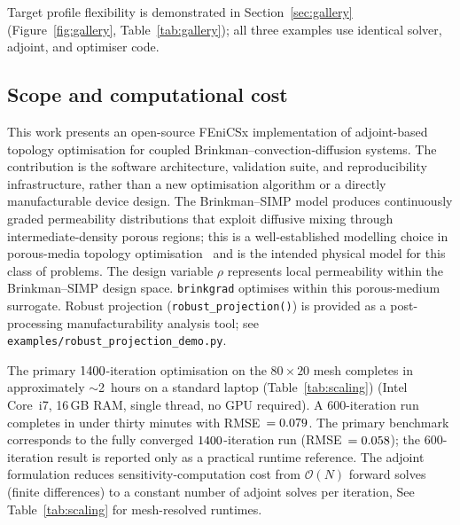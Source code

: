 Target profile flexibility is demonstrated in
Section~\ref{sec:gallery} (Figure~\ref{fig:gallery},
Table~\ref{tab:gallery}); all three examples use identical
solver, adjoint, and optimiser code.

\subsection{Scope and computational cost}
This work presents an open-source FEniCSx implementation of
adjoint-based topology optimisation for coupled
Brinkman--convection-diffusion systems.
The contribution is the software architecture, validation suite,
and reproducibility infrastructure,
rather than a new optimisation algorithm
or a directly manufacturable device design.
The Brinkman--SIMP model produces continuously graded permeability
distributions that exploit diffusive mixing through intermediate-density
porous regions; this is a well-established modelling choice in
porous-media topology optimisation~\cite{borrvall2003,lazarov2016}
and is the intended physical model for this class of problems.
The design variable $\rho$ represents local permeability
within the Brinkman--SIMP design space.
\texttt{brinkgrad} optimises within this porous-medium surrogate.
Robust projection (\texttt{robust\_projection()}) is provided
as a post-processing manufacturability analysis tool;
see \texttt{examples/robust\_projection\_demo.py}.

The primary $1400$-iteration optimisation on the $80\times20$ mesh
completes in approximately $\sim$2~hours on a standard laptop
(Table~\ref{tab:scaling})
(Intel Core~i7, 16\,GB RAM, single thread, no GPU required).
A 600-iteration run completes in under thirty minutes with
RMSE~$=0.079$.
The primary benchmark corresponds to the fully converged
$1400$-iteration run (RMSE~$=0.058$);
the 600-iteration result is reported only as a practical runtime reference.
The adjoint formulation reduces sensitivity-computation cost
from $\mathcal{O}(N)$ forward solves (finite differences)
to a constant number of adjoint solves per iteration,
See Table~\ref{tab:scaling} for mesh-resolved runtimes.

